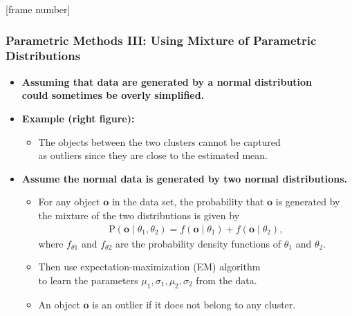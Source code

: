 \documentclass[aspectratio=169,t,xcolor=dvipsnames]{beamer}
\begin{document}
{
  [frame number]
  \begin{frame}
  	\frametitle{Parametric Methods III: Using Mixture of Parametric Distributions}
  	\begin{itemize}
  		\item \textbf{Assuming that data are generated by a normal distribution \\ could sometimes be overly simplified.}
  		\item \textbf{Example (right figure):}
  		      \begin{itemize}
  		      	\item The objects between the two clusters cannot be captured \\
              as outliers since they are close to the estimated mean.
  		      \end{itemize}
  		\item \textbf{Assume the normal data is generated by {\color{airforceblue}two normal distributions.}}
  		      \begin{itemize}
  		      	\item For any object $\mathbf{o}$ in the data set, the probability that $\mathbf{o}$ is generated by the mixture of the two distributions is given by
              \begin{align}
                \text{P}(\mathbf{o} \; \vert \; \theta_1, \theta_2) = f(\mathbf{o} \; \vert \; \theta_1) + f(\mathbf{o} \; \vert \; \theta_2),
              \end{align}
              where $f_{\theta 1}$ and $f_{\theta 2}$ are the probability density functions of $\theta_1$ and $\theta_2$.
  		      	\item Then use expectation-maximization (EM) algorithm \\
              to learn the parameters $\mu_1, \sigma_1, \mu_2, \sigma_2$ from the data.
  		      	\item An object $\mathbf{o}$ is an outlier if it does not belong to any cluster.
  		      \end{itemize}
  	\end{itemize}
  \end{frame}
}
\end{document}
